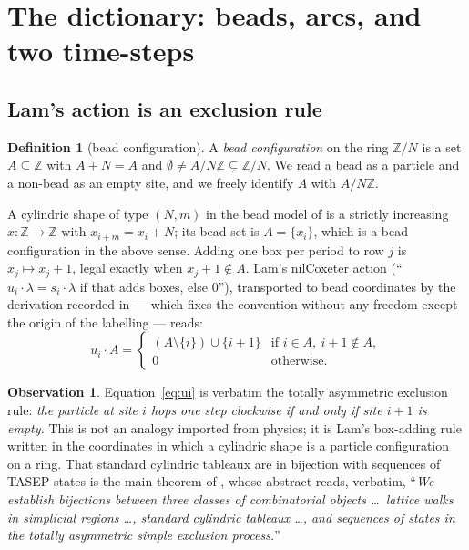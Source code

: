 \documentclass[11pt]{article}
\theoremstyle{plain}
\theoremstyle{definition}
\newtheorem{defn}[thm]{Definition}
\newtheorem{obs}[thm]{Observation}
\newcommand{\Z}{\mathbb{Z}}
\begin{document}
\section{The dictionary: beads, arcs, and two time-steps}\label{sec:dict}

\subsection{Lam's action is an exclusion rule}

\begin{defn}[bead configuration]
A \emph{bead configuration} on the ring $\Z/N$ is a set $A\subseteq\Z$ with $A+N=A$ and
$\emptyset\ne A/N\Z\subsetneq\Z/N$. We read a bead as a particle and a non-bead as an empty
site, and we freely identify $A$ with $A/N\Z$.
\end{defn}

A cylindric shape of type $(N,m)$ in the bead model of \cite[\S2]{ClioCyl} is a strictly
increasing $x:\Z\to\Z$ with $x_{i+m}=x_i+N$; its bead set is $A=\{x_i\}$, which is a bead
configuration in the above sense. Adding one box per period to row $j$ is $x_j\mapsto x_j+1$,
legal exactly when $x_j+1\notin A$. Lam's nilCoxeter action \cite[l.1700--1721]{Lam2006}
(``$u_i\cdot\lambda=s_i\cdot\lambda$ if that adds boxes, else $0$''), transported to bead
coordinates by the derivation recorded in \cite[\S6.1]{Clio321} --- which fixes the convention
without any freedom except the origin of the labelling --- reads:
\begin{equation}\label{eq:ui}
  u_i\cdot A=\begin{cases}(A\setminus\{i\})\cup\{i+1\} & \text{if } i\in A,\ i+1\notin A,\\
  0 & \text{otherwise.}\end{cases}
\end{equation}

\begin{obs}
Equation~\eqref{eq:ui} is verbatim the totally asymmetric exclusion rule: \emph{the particle at
site $i$ hops one step clockwise if and only if site $i+1$ is empty.} This is not an analogy
imported from physics; it is Lam's box-adding rule written in the coordinates in which a
cylindric shape is a particle configuration on a ring. That standard cylindric tableaux are in
bijection with sequences of TASEP states is the main theorem of \cite{Elizalde2507}, whose
abstract reads, verbatim, ``\emph{We establish bijections between three classes of
combinatorial objects \dots\ lattice walks in simplicial regions \dots, standard cylindric
tableaux \dots, and sequences of states in the totally asymmetric simple exclusion process.}''
\end{obs}
\end{document}
